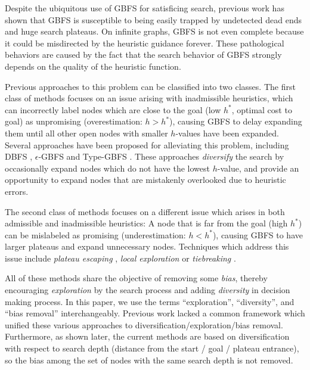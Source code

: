 Despite the ubiquitous use of GBFS for satisficing search,
previous work has shown  that GBFS is susceptible to being 
easily trapped by undetected dead ends and huge search plateaus.
On infinite graphs, GBFS is not even complete \cite{Valenzano2016}
because it could be misdirected by the heuristic guidance forever.
These pathological behaviors are caused by the fact that 
the search behavior of GBFS strongly depends on the
quality of the heuristic function.

Previous approaches to this problem can be classified into two classes.
The first class of methods focuses on an issue arising with inadmissible heuristics,
which can incorrectly label nodes which are close to the goal (low $h^*$, optimal cost to goal) as unpromising (overestimation: $h>h^*$), 
causing GBFS to delay expanding them until all other open nodes with smaller $h$-values have been expanded.
Several approaches have been proposed for alleviating this problem, including 
DBFS \cite{imai2011novel}, $\epsilon$-GBFS \cite{valenzano2014comparison} and Type-GBFS \cite{xie14type}.
These approaches \emph{diversify} the search by occasionally expand nodes which do not have the lowest $h$-value, 
and provide an opportunity to expand nodes that are mistakenly overlooked due to  heuristic errors.

The second class of methods focuses on a different issue which arises in both admissible and inadmissible heuristics:
A node that is far from the goal (high $h^*$) can be mislabeled as promising (underestimation: $h<h^*$), 
causing GBFS to have larger plateaus and expand unnecessary nodes.
Techniques which address this issue include  \emph{plateau escaping} \cite{Coles07}, \emph{local exploration} \cite{XieH14gbfsle} or \emph{tiebreaking} \cite{Asai2016}.

All of these methods share the objective of removing some \emph{bias},
thereby encouraging  \emph{exploration} by the search process
and adding \emph{diversity} in decision making process.
In this paper, we use the terms ``exploration'', ``diversity'', and ``bias removal'' interchangeably.
Previous work lacked a common framework which unified these various approaches to diversification/exploration/bias removal.
Furthermore, as shown later, the current \lsota methods are based on diversification with respect to search depth (distance from the start / goal / plateau entrance),
so the bias among the set of nodes with the same search depth is not removed.

